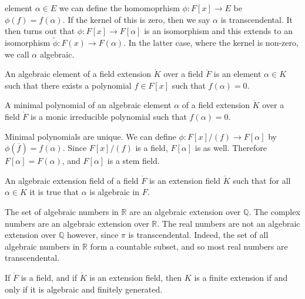 \documentclass{article}                                                        %
\begin{document}
        element $\alpha\in{E}$ we can define the homomoprhism
        $\phi:F[x]\rightarrow{E}$ be $\phi(f)=f(\alpha)$. If the kernel of this
        is zero, then we say $\alpha$ is transcendental. It then turns out that
        $\phi:F[x]\rightarrow{F}[\alpha]$ is an isomorphism and this extends
        to an isomorphism $\tilde{\phi}:F(x)\rightarrow{F}(\alpha)$. In the
        latter case, where the kernel is non-zero, we call $\alpha$ algebraic.
        \begin{definition}
            An algebraic element of a field extension $\ring{K}$ over a field
            $\ring{F}$ is an element $\alpha\in{K}$ such that there exists a
            polynomial $f\in{F}[x]$ such that $f(\alpha)=0$.
        \end{definition}
        \begin{definition}
            A minimal polynomial of an algebraic element $\alpha$ of a field
            extension $\ring{K}$ over a field $\ring{F}$ is a monic irreducible
            polynomial such that $f(\alpha)=0$.
        \end{definition}
        Minimal polynomials are unique. We can define
        $\phi:F[x]/(f)\rightarrow{F}[\alpha]$ by
        $\phi(\overline{f})=f(\alpha)$. Since $F[x]/(f)$ is a field, $F[\alpha]$
        is as well. Therefore $F[\alpha]=F(\alpha)$, and $F[\alpha]$ is a stem
        field.
        \begin{definition}
            An algebraic extension field of a field $\ring{F}$ is an extension
            field $\ring{K}$ such that for all $\alpha\in{K}$ it is true that
            $\alpha$ is algebraic in $F$.
        \end{definition}
        \begin{example}
            The set of algebraic numbers in $\mathbb{R}$ are an algebraic
            extension over $\mathbb{Q}$. The complex numbers are an algebraic
            extension over $\mathbb{R}$. The real numbers are not an algebraic
            extension over $\mathbb{Q}$ however, since $\pi$ is transcendental.
            Indeed, the set of all algebraic numbers in $\mathbb{R}$ form a
            countable subset, and so most real numbers are transcendental.
        \end{example}
        \begin{theorem}
            If $\ring{F}$ is a field, and if $\ring{K}$ is an extension field,
            then $K$ is a finite extension if and only if it is algebraic and
            finitely generated.
        \end{theorem}
\end{document}
